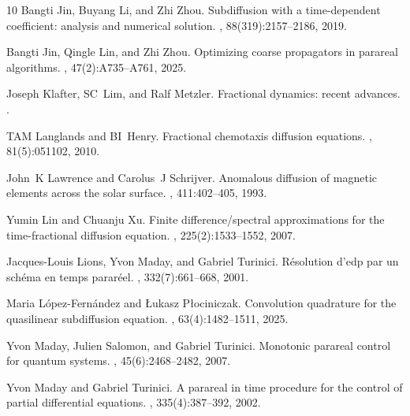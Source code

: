 \documentclass[12pt,a4paper]{article}
\begin{document}
\begin{thebibliography}{10}
	Bangti Jin, Buyang Li, and Zhi Zhou.
	\newblock Subdiffusion with a time-dependent coefficient: analysis and
	numerical solution.
	, 88(319):2157--2186, 2019.
	
	Bangti Jin, Qingle Lin, and Zhi Zhou.
	\newblock Optimizing coarse propagators in parareal algorithms.
	, 47(2):A735--A761, 2025.
	
	Joseph Klafter, SC~Lim, and Ralf Metzler.
	\newblock Fractional dynamics: recent advances.
	.
	
	TAM Langlands and BI~Henry.
	\newblock Fractional chemotaxis diffusion equations.
	, 81(5):051102, 2010.
	
	John~K Lawrence and Carolus~J Schrijver.
	\newblock Anomalous diffusion of magnetic elements across the solar surface.
	, 411:402--405, 1993.
	
	Yumin Lin and Chuanju Xu.
	\newblock Finite difference/spectral approximations for the time-fractional
	diffusion equation.
	, 225(2):1533--1552, 2007.
	
	Jacques-Louis Lions, Yvon Maday, and Gabriel Turinici.
	\newblock R{\'e}solution d'edp par un sch{\'e}ma en temps
	{\guillemotleft}parar{\'e}el{\guillemotright}.
	, 332(7):661--668, 2001.
	
	Maria L{\'o}pez-Fern{\'a}ndez and {\L}ukasz P{\l}ociniczak.
	\newblock Convolution quadrature for the quasilinear subdiffusion equation.
	, 63(4):1482--1511, 2025.
	
	Yvon Maday, Julien Salomon, and Gabriel Turinici.
	\newblock Monotonic parareal control for quantum systems.
	, 45(6):2468--2482, 2007.
	
	Yvon Maday and Gabriel Turinici.
	\newblock A parareal in time procedure for the control of partial differential
	equations.
	, 335(4):387--392, 2002.
	

\end{thebibliography}
\end{document}

